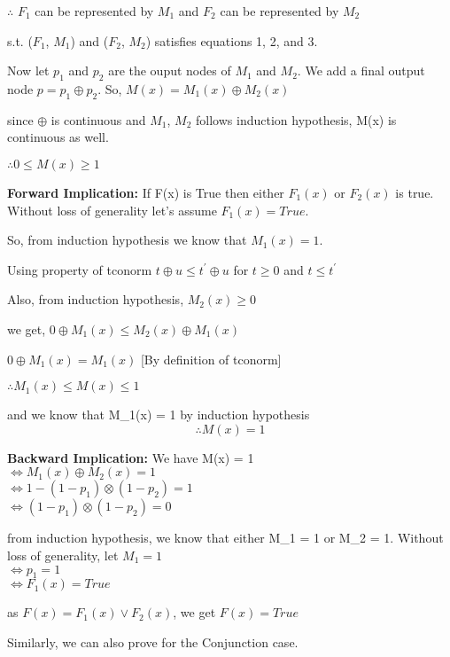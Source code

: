 $\therefore$ $F_1$ can be represented by $M_1$ and $F_2$ can be represented by $M_2$

s.t. ($F_1$, $M_1$) and ($F_2$, $M_2$) satisfies equations 1, 2, and 3.

Now let $p_1$ and $p_2$ are the ouput nodes of $M_1$ and $M_2$. We add a final output node $p = p_1 \oplus p_2$.
So, $M(x) = M_1(x) \oplus M_2(x)$

since $\oplus$ is continuous and $M_1$, $M_2$ follows induction hypothesis,
M(x) is continuous as well.

$\therefore 0 \leq M(x) \geq 1$

\noindent\textbf{Forward Implication: } If F(x) is True then either $F_1(x)$ or $F_2(x)$
is true. Without loss of generality let's assume $F_1(x) = True$.

So, from induction hypothesis we know that $M_1(x) = 1$.

Using property of tconorm $t \oplus u \leq t^{'} \oplus u$ for $t \geq 0$ and $t \leq t^{'}$ 

Also, from induction hypothesis, $M_2(x) \geq 0$

we get, $0 \oplus M_1(x) \leq M_2(x) \oplus M_1(x)$

$0 \oplus M_1(x) = M_1(x)$ [By definition of tconorm]

$\therefore M_1(x) \leq M(x) \leq 1$

and we know that M_1(x) = 1 by induction hypothesis
$$\therefore M(x) = 1$$

\noindent\textbf{Backward Implication: } We have M(x) = 1 \\
$\iff M_1(x) \oplus M_2(x) = 1$ \\
$\iff 1 - (1 - p_1) \otimes (1 - p_2) = 1$ \\
$\iff (1 - p_1) \otimes (1 - p_2) = 0$

from induction hypothesis, we know that either M_1 = 1 or M_2 = 1. Without loss of generality, 
let $M_1 = 1$ \\
$\iff p_1 = 1$ \\
$\iff F_1(x) = True$

as $F(x) = F_1(x) \lor F_2(x)$, we get
$F(x) = True$

Similarly, we can also prove for the Conjunction case.
